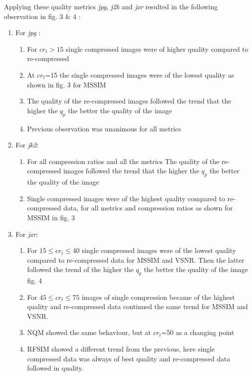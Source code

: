 \documentclass[10pt,twocolumn,letterpaper]{article}
\begin{document}
Applying these quality metrics \emph{jpg}, \emph{j2k} and \emph{jxr} resulted in the following observation in fig. 3 \& 4 :
\begin{enumerate}
	\item For \emph{jpg} :
	\begin{enumerate}
		 	 
		 \item For  $cr_t>15 $ single compressed images were of higher quality compared to re-compressed
		 \item At $cr_t$=15 the single compressed images were of the lowest quality as shown in fig. 3 for MSSIM
		 \item The quality of the re-compressed images followed the trend that the higher the $q_p$ the better the quality of the image
		 \item Previous observation was unanimous for all metrics
	\end{enumerate}
	\item For \emph{jk2}:
   \begin{enumerate}
			\item   For all compression ratios and all the metrics The quality of the re-compressed images followed the trend that the higher the $q_p$ the better the quality of the image
			\item  Single compressed images were of the highest quality compared to re-compressed data, for all metrics and compression ratios as shown for MSSIM in fig. 3 	 
			  
	\end{enumerate}
		\item For \emph{jxr}:
   \begin{enumerate}
        \item For $15\leq{cr_t}\leq{40}$ single compressed images were of the lowest quality compared to re-compressed data for MSSIM and VSNR. Then the latter followed the trend of the higher the $q_p$ the better the quality of the image fig. 4		 
        \item For $45\leq{cr_t}\leq{75}$ images of single compression became of the highest quality and  re-compressed data continued the same trend for MSSIM and VSNR.
        \item NQM showed the same behaviour, but at ${cr_t}$=50 as a changing point
        \item RFSIM showed a different trend from the previous, here single compressed data was always of best quality and re-compressed data followed in quality. 
   
   
   \end{enumerate}
\end{enumerate}
\end{document}
